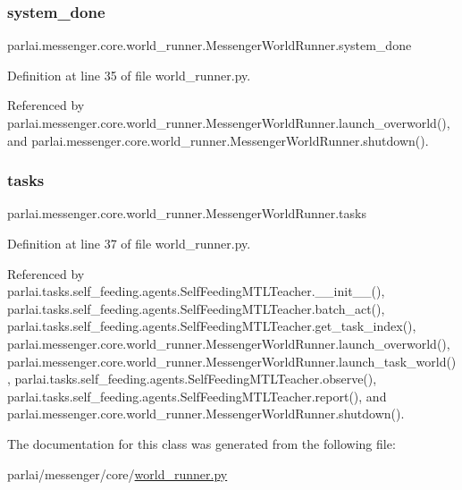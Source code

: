 \subsubsection{\texorpdfstring{system\+\_\+done}{system\_done}}
{\footnotesize\ttfamily parlai.\+messenger.\+core.\+world\+\_\+runner.\+Messenger\+World\+Runner.\+system\+\_\+done}



Definition at line 35 of file world\+\_\+runner.\+py.



Referenced by parlai.\+messenger.\+core.\+world\+\_\+runner.\+Messenger\+World\+Runner.\+launch\+\_\+overworld(), and parlai.\+messenger.\+core.\+world\+\_\+runner.\+Messenger\+World\+Runner.\+shutdown().

\mbox{\label{classparlai_1_1messenger_1_1core_1_1world__runner_1_1MessengerWorldRunner_a55237e6f296b0fddb24782427351f2cb}} 
\subsubsection{\texorpdfstring{tasks}{tasks}}
{\footnotesize\ttfamily parlai.\+messenger.\+core.\+world\+\_\+runner.\+Messenger\+World\+Runner.\+tasks}



Definition at line 37 of file world\+\_\+runner.\+py.



Referenced by parlai.\+tasks.\+self\+\_\+feeding.\+agents.\+Self\+Feeding\+M\+T\+L\+Teacher.\+\_\+\+\_\+init\+\_\+\+\_\+(), parlai.\+tasks.\+self\+\_\+feeding.\+agents.\+Self\+Feeding\+M\+T\+L\+Teacher.\+batch\+\_\+act(), parlai.\+tasks.\+self\+\_\+feeding.\+agents.\+Self\+Feeding\+M\+T\+L\+Teacher.\+get\+\_\+task\+\_\+index(), parlai.\+messenger.\+core.\+world\+\_\+runner.\+Messenger\+World\+Runner.\+launch\+\_\+overworld(), parlai.\+messenger.\+core.\+world\+\_\+runner.\+Messenger\+World\+Runner.\+launch\+\_\+task\+\_\+world(), parlai.\+tasks.\+self\+\_\+feeding.\+agents.\+Self\+Feeding\+M\+T\+L\+Teacher.\+observe(), parlai.\+tasks.\+self\+\_\+feeding.\+agents.\+Self\+Feeding\+M\+T\+L\+Teacher.\+report(), and parlai.\+messenger.\+core.\+world\+\_\+runner.\+Messenger\+World\+Runner.\+shutdown().



The documentation for this class was generated from the following file\+:\begin{DoxyCompactItemize}
\item 
parlai/messenger/core/\hyperlink{world__runner_8py}{world\+\_\+runner.\+py}\end{DoxyCompactItemize}
